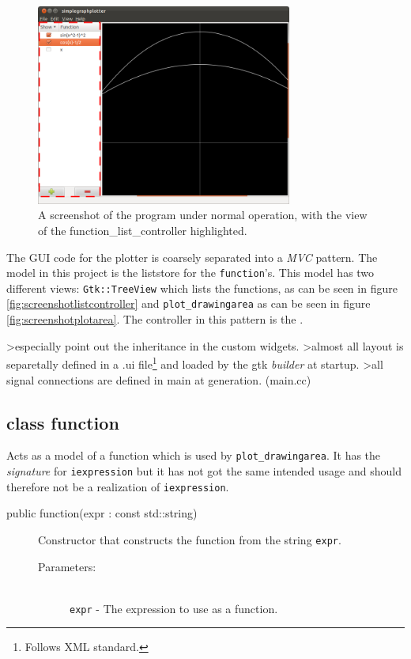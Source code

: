 \documentclass[a4paper,11pt]{kth-mag}
\begin{document}
\begin{figure}[ht]
\begin{center}
    \includegraphics[width=0.75\textwidth]{screenshot00_function_list_controller.png}
    \caption{\small{A screenshot of the program under normal operation, with
    the view of the function\_list\_controller highlighted.}}
   \label{fig:screenshotfunctionlistcontroller}
\end{center}
\end{figure}

The GUI code for the plotter is coarsely separated into a \emph{MVC} pattern. 
The model in this project is the liststore for the \texttt{function}'s. This model 
has two different views: \texttt{Gtk::TreeView} which lists the functions, as can be seen
in figure \ref{fig:screenshotlistcontroller} and
\texttt{plot\_drawingarea} as can be seen in figure
\ref{fig:screenshotplotarea}.
The controller in this pattern is the \texttt{}.

>especially point out the inheritance in the custom widgets.
>almost all layout is separetally defined in a .ui file\footnote{Follows XML
standard.} and loaded by the gtk \emph{builder} at startup.
>all signal connections are defined in main at generation. (main.cc)


\subsection{class function}
Acts as a model of a function which is used by \texttt{plot\_drawingarea}.
It has the \emph{signature} for \texttt{iexpression} but it has not got the
same intended usage and should therefore not be a realization of
\texttt{iexpression}.

\begin{description}
    \item[public function(expr : const std::string)] Constructor 
    that constructs the function from the string \texttt{expr}.
    \begin{description}
        \item[Parameters:]~\\
            \verb+expr+ - The expression to use as a function.
    \end{description}
\end{description}
\end{document}
